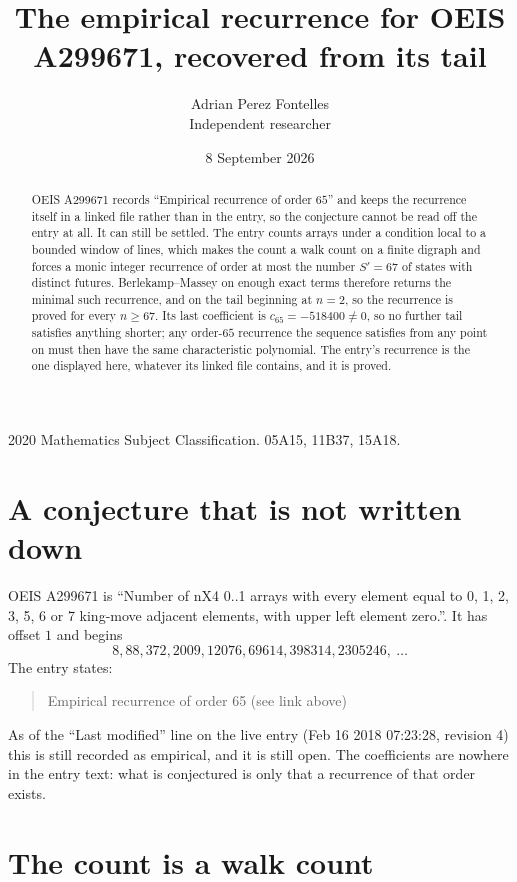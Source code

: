 \documentclass[11pt,a4paper]{article}
\title{The empirical recurrence for OEIS A299671, recovered from its tail}
\author{Adrian Perez Fontelles\\ \small Independent researcher}
\date{8 September 2026}
\theoremstyle{plain}
\theoremstyle{definition}
\begin{document}
\maketitle

\begin{abstract}
OEIS A299671 records ``Empirical recurrence of order $65$'' and keeps the recurrence itself in
a linked file rather than in the entry, so the conjecture cannot be read off the entry at all.
It can still be settled. The entry counts arrays under a condition local to a bounded window of
lines, which makes the count a walk count on a finite digraph and forces a monic integer
recurrence of order at most the number $S'=67$ of states with distinct futures. Berlekamp--Massey on
enough exact terms therefore returns the minimal such recurrence, and on the tail beginning at $n=2$, so the recurrence is proved for every $n\ge67$.
Its last coefficient is $c_{65}=-518400\neq0$, so no further tail satisfies anything
shorter; any order-$65$ recurrence the sequence satisfies from any point on must then have
the same characteristic polynomial. The entry's recurrence is the one displayed here, whatever
its linked file contains, and it is proved.
\end{abstract}

\noindent\small 2020 Mathematics Subject Classification. 05A15, 11B37, 15A18.\normalsize

\section{A conjecture that is not written down}

OEIS A299671 is ``Number of nX4 0..1 arrays with every element equal to 0, 1, 2, 3, 5, 6 or 7 king-move adjacent elements, with upper left element zero.''. It has offset $1$ and begins
\[
8, 88, 372, 2009, 12076, 69614, 398314, 2305246,\ \dots
\]
The entry states:
\begin{quote}
Empirical recurrence of order 65 (see link above)
\end{quote}
As of the ``Last modified'' line on the live entry (Feb 16 2018 07:23:28, revision 4)
this is still recorded as empirical, and it is still open. The coefficients are nowhere in the
entry text: what is conjectured is only that a recurrence of that order exists.

\section{The count is a walk count}
\end{document}
